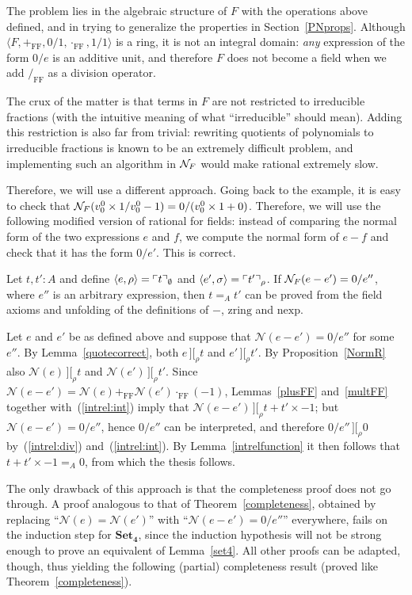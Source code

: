 \documentclass[numreferences]{kluwer}
\newcommand{\intII}{\,]\![}
\newcommand{\intrel}{\mathbin{\intII_{\rho}}}
\newcommand{\N}{\ensuremath{\mathcal{N}}}
\newcommand{\NF}{\ensuremath{{\cal N}_{F}}}
\newcommand{\tacticname}[1]{\textsf{#1}}
\newcommand{\rational}{\tacticname{rational}}
\newcommand{\zring}{\ensuremath{\mathrm{zring}}}
\newcommand{\nexp}{\ensuremath{\mathrm{nexp}}}
\newcommand{\axiom}[1]{\ensuremath{\mathbf{#1}}}
\newcommand{\mlfn}[2]{\ensuremath\ulcorner{#1}\urcorner_{#2}}
\newcommand{\plusFF}{\ensuremath{+_{\mathrm{FF}}}}
\newcommand{\multFF}{\ensuremath{\cdot_{\mathrm{FF}}}}
\newcommand{\divFF}{\ensuremath{/_{\mathrm{FF}}}}
\begin{document}
\begin{article}
The problem lies in the algebraic structure of $F$ with the operations
above defined, and in trying to generalize the properties in
Section~\ref{PNprops}.
Although $\langle F,\plusFF,0/1,\multFF,1/1\rangle$ is a ring, it is not
an integral domain: \emph{any} expression of the form $0/e$ is an additive
unit, and therefore $F$ does not become a field when we add $\divFF$ as
a division operator.

The crux of the matter is that terms in $F$ are not restricted to
irreducible fractions (with the intuitive meaning of what ``irreducible''
should mean).
Adding this restriction is also far from trivial: rewriting quotients of
polynomials to irreducible fractions is known to be an extremely difficult
problem, and implementing such an algorithm in {\NF} would make {\rational}
extremely slow.

Therefore, we will use a different approach.
Going back to the example, it is easy to check that
$\NF(v^0_0\times 1/v^0_0-1)=0/(v^0_0\times 1+0)$.
Therefore, we will use the following modified version of {\rational}
for fields: instead of comparing the normal form of the two expressions
$e$ and $f$, we compute the normal form of $e-f$ and check that it has
the form $0/e'$.
This is correct.

\begin{corollary}\label{correctnessF1}
Let $t,t':A$ and define $\langle e,\rho\rangle=\mlfn{t}{\emptyset}$ and
$\langle e',\sigma\rangle=\mlfn{t'}{\rho}$.  If $\NF(e-e')=0/e''$, where
$e''$ is an arbitrary expression, then $t=_A t'$ can be proved from the
field axioms and unfolding of the definitions of $-$, {\zring} and {\nexp}.
\end{corollary}
\begin{pf}
Let $e$ and $e'$ be as defined above and suppose that $\N(e-e')=0/e''$ for
some $e''$.
By Lemma~\ref{quotecorrect}, both $e\intrel t$ and $e'\intrel t'$.
By Proposition~\ref{NormR} also $\N(e)\intrel t$ and $\N(e')\intrel t'$.
Since $\N(e-e')=\N(e)\plusFF \N(e')\multFF(-1)$, Lemmas~\ref{plusFF}
and~\ref{multFF} together with~(\ref{intrel:int}) imply that
$\N(e-e')\intrel t+t'\times -1$; but $\N(e-e')=0/e''$, hence $0/e''$ can
be interpreted, and therefore $0/e''\intrel 0$ by~(\ref{intrel:div})
and~(\ref{intrel:int}).  By Lemma~\ref{intrelfunction} it then follows
that $t+t'\times -1=_A 0$, from which the thesis follows.
\end{pf}

The only drawback of this approach is that the completeness proof does not
go through.
A proof analogous to that of Theorem~\ref{completeness}, obtained by
replacing ``$\N(e)=\N(e')$'' with ``$\N(e-e')=0/e''$'' everywhere, fails
on the induction step for \axiom{Set_4}, since the induction hypothesis
will not be strong enough to prove an equivalent of Lemma~\ref{set4}.
All other proofs can be adapted, though, thus yielding the following
(partial) completeness result (proved like Theorem~\ref{completeness}).


\end{article}
\end{document}
